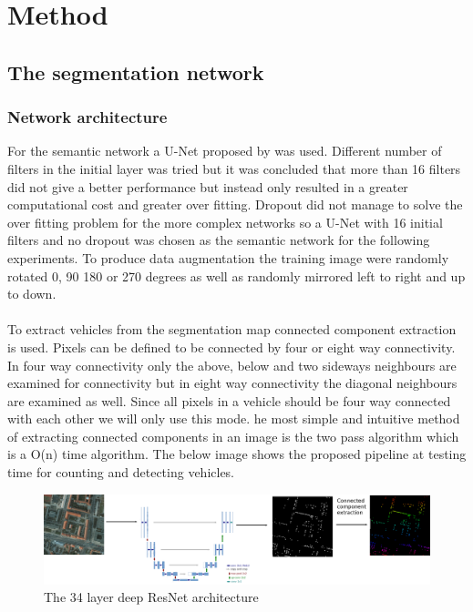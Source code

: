 \documentclass{kththesis}
\begin{document}
\chapter{Method}
\section{The segmentation network}
\subsection{Network architecture}
For the semantic network a U-Net proposed by \parencite{ronneberger_u-net:_2015} was used. Different number of filters in the initial layer was tried but it was concluded that more than 16 filters did not give a better performance but instead only resulted in a greater computational cost and greater over fitting. Dropout did not manage to solve the over fitting problem for the more complex networks so a U-Net with 16 initial filters and no dropout was chosen as the semantic network for the following experiments. To produce data augmentation the training image were randomly rotated 0, 90 180 or 270 degrees as well as randomly mirrored left to right and up to down.\\
\\
To extract vehicles from the segmentation map connected component extraction is used. Pixels can be defined to be connected by four or eight way connectivity. In four way connectivity only the above, below and two sideways neighbours are examined for connectivity but in eight way connectivity the diagonal neighbours are examined as well. Since all pixels in a vehicle should be four way connected with each other we will only use this mode. he most simple and intuitive method of extracting connected components in an image is the two pass algorithm \parencite{stockman_computer_2001} which is a O(n) time algorithm. The below image shows the proposed pipeline at testing time for counting and detecting vehicles.
\begin{figure}[H]
  \centering
      \includegraphics[scale=.16]{net}
  \caption{The 34 layer deep ResNet architecture \parencite{simonyan_very_2014}} \label{fig:vgg}
\end{figure}
\end{document}
